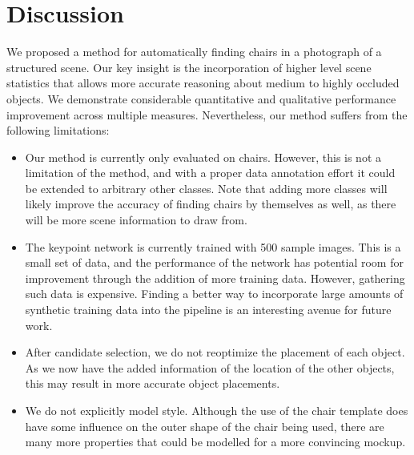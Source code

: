 \documentclass[10pt,twocolumn,letterpaper]{article}
\begin{document}
\section{Discussion}
We proposed a method for automatically finding chairs in a photograph of a structured scene.
Our key insight is the incorporation of higher level
scene statistics that allows more accurate reasoning about medium to highly occluded objects. 
We demonstrate considerable quantitative and qualitative performance improvement across multiple measures. Nevertheless, our method suffers from the following limitations:
\begin{itemize}
    \item Our method is currently only evaluated on chairs. However, this is not a limitation of the method, and with a proper data annotation effort 
        it could be extended to arbitrary other classes. Note that adding more classes will likely improve the accuracy of finding chairs by themselves as well,
        as there will be more scene information to draw from.
    \item The keypoint network is currently trained with 500 sample images. This is a small set of data, and the performance of the network has potential room for improvement
        through the addition of more training data. However, gathering such data is expensive. Finding a better way to incorporate large amounts of synthetic training
        data into the pipeline is an interesting avenue for future work.
    \item After candidate selection, we do not reoptimize the placement of each object. As we now have the added information of the location of the other objects, 
        this may result in more accurate object placements.
    \item We do not explicitly model style. Although the use of the chair template does have some influence on the outer shape of the chair being used, there are many more
        properties that could be modelled for a more convincing mockup.
\end{itemize}


{\small


}



%
\end{document}
